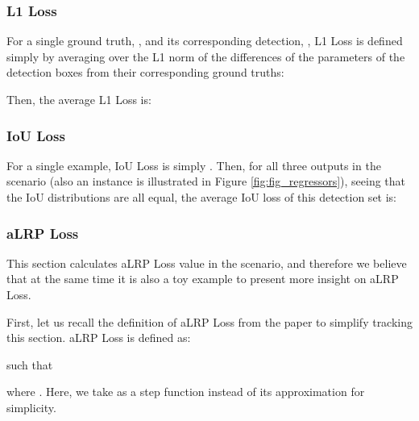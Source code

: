 \documentclass{article}
\begin{document}
\subsubsection{L1 Loss}
For a single ground truth, , and its corresponding detection, , L1 Loss is defined simply by averaging over the L1 norm of the differences of the parameters of the detection boxes from their corresponding ground truths:


Then, the average L1 Loss is:



\subsubsection{IoU Loss}
For a single example, IoU Loss is simply . Then, for all three outputs in the scenario (also an instance is illustrated in Figure \ref{fig:fig_regressors}), seeing that the IoU distributions are all equal, the average IoU loss of this detection set is:


\subsubsection{aLRP Loss}
This section calculates aLRP Loss value in the scenario, and therefore we believe that at the same time it is also a toy example to present more insight on aLRP Loss.

 First, let us recall the definition of aLRP Loss from the paper to simplify tracking this section. aLRP Loss is defined as:

such that

where . Here, we take  as a step function instead of its approximation for simplicity.
\end{document}
